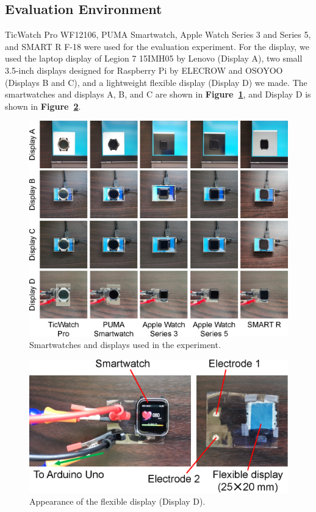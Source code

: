 \documentclass[sigchi,authordraft]{acmart}
\newcommand\figref[1]{\textbf{Figure~\ref{fig:#1}}}
\begin{document}
\subsection{Evaluation Environment}
TicWatch Pro WF12106, PUMA Smartwatch, Apple Watch Series 3 and Series 5, and SMART R F-18 were used for the evaluation experiment. For the display, we used the laptop display of Legion 7 15IMH05 by Lenovo (Display A), two small 3.5-inch displays designed for Raspberry Pi by ELECROW and OSOYOO (Displays B and C), and a lightweight flexible display \cite{flexible_display} (Display D) we made. The smartwatches and displays A, B, and C are shown in \figref{smartwatches}, and Display D is shown in \figref{flexible}.

\begin{figure}[!t]
  \centering
  \includegraphics[width=0.78\linewidth]{figures/smartwatches.eps}
  \caption{Smartwatches and displays used in the experiment.}
  \label{fig:smartwatches}
\end{figure}

\begin{figure}[!t]
  \centering
  \includegraphics[width=0.75\linewidth]{figures/flexible.eps}
  \caption{Appearance of the flexible display (Display D).}
  \label{fig:flexible}
\end{figure}
\end{document}
